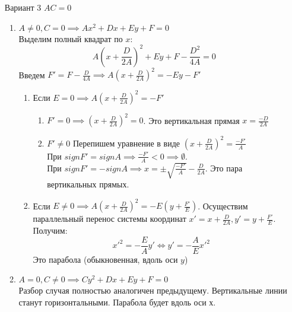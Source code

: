 \documentclass[a4paper,12pt]{article}
\begin{document}
\begin{enumerate}
\begin{enumerate}
\end{enumerate}

\bigskip
\item[Вариант 3] $AC = 0 $

\begin{enumerate}

\item $ A \neq 0, C = 0 \implies Ax^2 + Dx + Ey + F = 0 $ \\
Выделим полный квадрат по $x$:
\[
A \left( x + \frac{D}{2A} \right)^2 + Ey + F - \frac{D^2}{4A} = 0
\]
Введем 
$ F' = F - \frac{D}{4A} \implies A \left( x + \frac{D}{2A} \right)^2 = -Ey - F' $

\begin{enumerate}
\item Если $ E =  0 \implies A \left( x + \frac{D}{2A} \right)^2 = -F' $
\begin{enumerate}
\item $F' = 0 \implies \left( x + \frac{D}{2A} \right)^2 = 0 $. 
Это вертикальная прямая $ x = \frac{-D}{2A} $
\item $ F' \neq 0 $ Перепишем уравнение в виде 
$ \left( x + \frac{D}{2A} \right)^2 = \frac{-F'}{A} $ \\
При $ signF' = signA \implies \frac{-F'}{A} < 0 \implies \emptyset $.  \\
При $ signF' = - signA  \implies x = \pm \sqrt{\frac{-F'}{A}} - \frac{D}{2A} $. Это пара вертикальных прямых.
\end{enumerate}

\item Если $ E \neq 0 \implies A \left( x + \frac{D}{2A} \right)^2 = -E( y + \frac{F'}{E} ) $.
Осуществим параллельный перенос системы координат 
$ x' = x + \frac{D}{2A}, y' = y + \frac{F'}{E} $. Получим:
\[
{x'}^2 = - \frac{E}{A} y'  \iff y' = - \frac{A}{E} {x'}^2
\]
Это парабола (обыкновенная, вдоль оси $y$)
\end{enumerate}

\item $ A = 0, C \neq 0 \implies Cy^2 + Dx + Ey + F = 0  $ \\
Разбор случая полностью аналогичен предыдущему. Вертикальные линии станут горизонтальными. Парабола будет вдоль оси х.
\end{enumerate}
\end{enumerate}





\newpage
\printindex
\end{document}

